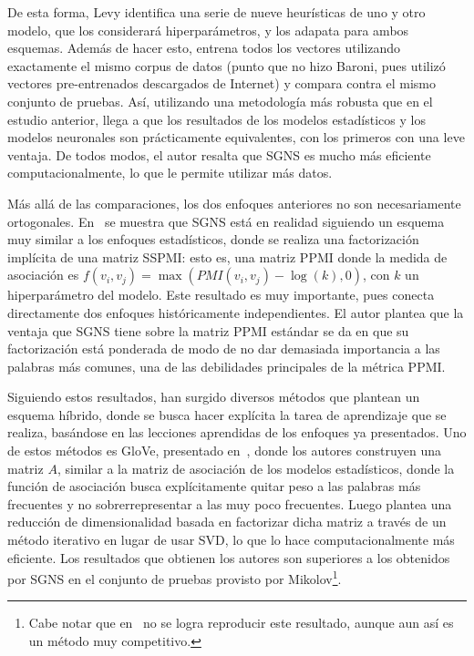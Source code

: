 De esta forma, Levy identifica una serie de nueve heurísticas de uno y otro modelo, que los
considerará hiperparámetros, y los adapata para ambos esquemas. Además de hacer esto, entrena todos
los vectores utilizando exactamente el mismo corpus de datos (punto que no hizo Baroni, pues utilizó
vectores pre-entrenados descargados de Internet) y compara contra el mismo conjunto de pruebas. Así,
utilizando una metodología más robusta que en el estudio anterior, llega a que los resultados de los
modelos estadísticos y los modelos neuronales son prácticamente equivalentes, con los primeros con
una leve ventaja. De todos modos, el autor resalta que SGNS es mucho más eficiente
computacionalmente, lo que le permite utilizar más datos.


Más allá de las comparaciones, los dos enfoques anteriores no son necesariamente
ortogonales. En~\cite{Levy2014a} se muestra que SGNS está en realidad siguiendo un esquema muy
similar a los enfoques estadísticos, donde se realiza una factorización implícita de una matriz
SSPMI\@: esto es, una matriz PPMI donde la medida de asociación es $f(v_i, v_j) = \max(PMI(v_i, v_j)
- \log(k), 0)$, con $k$ un hiperparámetro del modelo. Este resultado es muy importante, pues conecta
directamente dos enfoques históricamente independientes. El autor plantea que la ventaja que SGNS
tiene sobre la matriz PPMI estándar se da en que su factorización está ponderada de modo de no dar
demasiada importancia a las palabras más comunes, una de las debilidades principales de la métrica
PPMI\@.


Siguiendo estos resultados, han surgido diversos métodos que plantean un esquema híbrido, donde se
busca hacer explícita la tarea de aprendizaje que se realiza, basándose en las lecciones aprendidas
de los enfoques ya presentados. Uno de estos métodos es GloVe, presentado en~\cite{Pennington2014},
donde los autores construyen una matriz $A$, similar a la matriz de asociación de los modelos
estadísticos, donde la función de asociación busca explícitamente quitar peso a las palabras más
frecuentes y no sobrerrepresentar a las muy poco frecuentes. Luego plantea una reducción de
dimensionalidad basada en factorizar dicha matriz a través de un método iterativo en lugar de usar
SVD, lo que lo hace computacionalmente más eficiente. Los resultados que obtienen los autores son
superiores a los obtenidos por SGNS en el conjunto de pruebas provisto por Mikolov\footnote{Cabe
notar que en~\cite{Levy2015} no se logra reproducir este resultado, aunque aun así es un método muy
competitivo.}.


